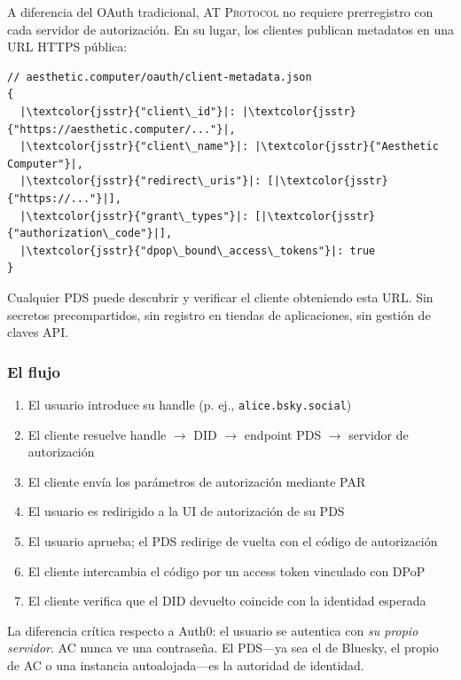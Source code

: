 \documentclass[10pt,letterpaper,twocolumn]{article}
\newcommand{\atproto}{\textsc{AT Protocol}}
\begin{document}
A diferencia del OAuth tradicional, \atproto{} no requiere prerregistro con cada servidor de autorización. En su lugar, los clientes publican metadatos en una URL HTTPS pública:

\begin{lstlisting}[style=acjsstyle]
// aesthetic.computer/oauth/client-metadata.json
{
  |\textcolor{jsstr}{"client\_id"}|: |\textcolor{jsstr}{"https://aesthetic.computer/..."}|,
  |\textcolor{jsstr}{"client\_name"}|: |\textcolor{jsstr}{"Aesthetic Computer"}|,
  |\textcolor{jsstr}{"redirect\_uris"}|: [|\textcolor{jsstr}{"https://..."}|],
  |\textcolor{jsstr}{"grant\_types"}|: [|\textcolor{jsstr}{"authorization\_code"}|],
  |\textcolor{jsstr}{"dpop\_bound\_access\_tokens"}|: true
}
\end{lstlisting}

Cualquier PDS puede descubrir y verificar el cliente obteniendo esta URL. Sin secretos precompartidos, sin registro en tiendas de aplicaciones, sin gestión de claves API.

\subsubsection{El flujo}

\begin{enumerate}
  \item El usuario introduce su handle (p. ej., \texttt{alice.bsky.social})
  \item El cliente resuelve handle $\to$ DID $\to$ endpoint PDS $\to$ servidor de autorización
  \item El cliente envía los parámetros de autorización mediante PAR
  \item El usuario es redirigido a la UI de autorización de su PDS
  \item El usuario aprueba; el PDS redirige de vuelta con el código de autorización
  \item El cliente intercambia el código por un access token vinculado con DPoP
  \item El cliente verifica que el DID devuelto coincide con la identidad esperada
\end{enumerate}

La diferencia crítica respecto a Auth0: el usuario se autentica con \emph{su propio servidor}. AC nunca ve una contraseña. El PDS---ya sea el de Bluesky, el propio de AC o una instancia autoalojada---es la autoridad de identidad.

\end{document}
